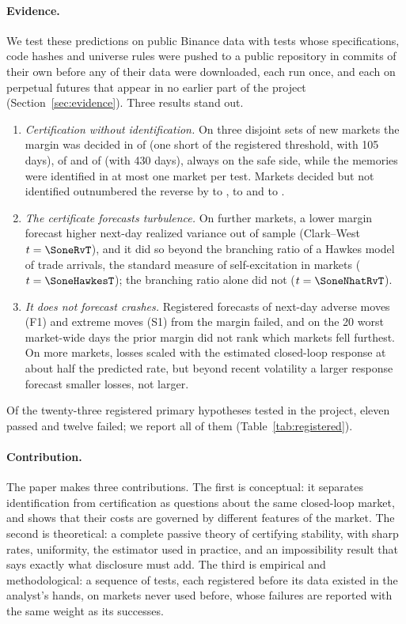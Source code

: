 \documentclass[12pt]{article}
\theoremstyle{definition}
\theoremstyle{remark}
\begin{document}
\paragraph{Evidence.} We test these predictions on public Binance data with tests whose specifications, code hashes and universe rules were pushed to a public repository in commits of their own before any of their data were downloaded, each run once, and each on perpetual futures that appear in no earlier part of the project (Section~\ref{sec:evidence}). Three results stand out.
\begin{enumerate}[label=(\roman*)]
\item \emph{Certification without identification.} On three disjoint sets of new markets the margin was decided in \CtwoDecided{} of \CtwoSymbols{} (one short of the registered threshold, with 105 days), \CthreeDecided{} of \CthreeSymbols{} and \FoneDecided{} of \FoneSymbols{} (with 430 days), always on the safe side, while the memories were identified in at most one market per test. Markets decided but not identified outnumbered the reverse by \CtwoB{} to \CtwoC{}, \CthreeB{} to \CthreeC{} and \FoneB{} to \FoneC{}.
\item \emph{The certificate forecasts turbulence.} On \SoneSymbols{} further markets, a lower margin forecast higher next-day realized variance out of sample (Clark--West $t=\SoneRvT$), and it did so beyond the branching ratio of a Hawkes model of trade arrivals, the standard measure of self-excitation in markets ($t=\SoneHawkesT$); the branching ratio alone did not ($t=\SoneNhatRvT$).
\item \emph{It does not forecast crashes.} Registered forecasts of next-day adverse moves (F1) and extreme moves (S1) from the margin failed, and on the 20 worst market-wide days the prior margin did not rank which markets fell furthest. On \RoneSymbols{} more markets, losses scaled with the estimated closed-loop response at about half the predicted rate, but beyond recent volatility a larger response forecast smaller losses, not larger.
\end{enumerate}
Of the twenty-three registered primary hypotheses tested in the project, eleven passed and twelve failed; we report all of them (Table~\ref{tab:registered}).

\paragraph{Contribution.} The paper makes three contributions. The first is conceptual: it separates identification from certification as questions about the same closed-loop market, and shows that their costs are governed by different features of the market. The second is theoretical: a complete passive theory of certifying stability, with sharp rates, uniformity, the estimator used in practice, and an impossibility result that says exactly what disclosure must add. The third is empirical and methodological: a sequence of tests, each registered before its data existed in the analyst's hands, on markets never used before, whose failures are reported with the same weight as its successes.
\end{document}
